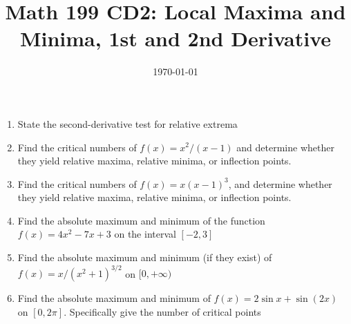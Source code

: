 \documentclass[12pt]{article}
\title{Math 199 CD2: Local Maxima and Minima, 1st and 2nd Derivative}
\date{\today}
\begin{document}
	
	\maketitle

	\begin{enumerate}
	\item State the second-derivative test for relative extrema
	\vskip 4cm
	\item Find the critical numbers of $f(x) = x ^2/(x - 1)$ and determine whether they yield relative maxima, relative
	minima, or inflection points.
	\vskip 4cm
	\item Find the critical numbers of $f(x) = x(x - 1)^3$, and determine whether they yield relative maxima, relative
	minima, or inflection points.
	\vskip 4cm
	\newpage
	\item Find the absolute maximum and minimum of the function $f(x) = 4x^2 - 7x + 3$ on the interval $[-2,3]$
	\vskip 4cm
	\item Find the absolute maximum and minimum (if they exist) of $f(x)=x/(x^2+1)^{3/2}$ on $[0,+\infty)$
	\vskip 6cm
	\item Find the absolute maximum and minimum of $f(x) = 2\sin x + \sin (2x)$ on $[0,2\pi]$. Specifically give the number of critical points
	\end{enumerate}
\end{document}

